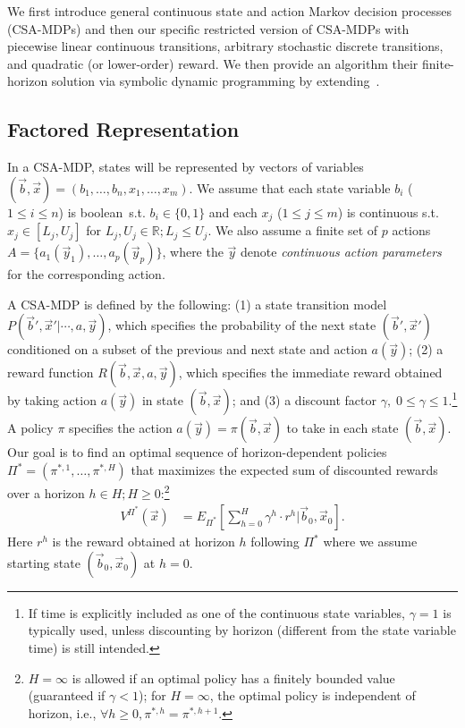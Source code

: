\label{sec:csamdp}

We first introduce general continuous state and action Markov decision
processes (CSA-MDPs) and then our specific restricted version of
CSA-MDPs with piecewise linear continuous transitions,
arbitrary stochastic discrete transitions, and quadratic (or
lower-order) reward.  We then provide an algorithm their
finite-horizon solution via symbolic dynamic programming by
extending~\cite{sanner_uai11}.

\subsection{Factored Representation}

In a CSA-MDP, states will be represented by vectors of variables
$(\vec{b},\vec{x}) = ( b_1,\ldots,b_n,x_{1},\ldots,x_m )$.  We assume
that each state variable $b_i$ ($1 \leq i \leq n$) is
boolean$\,$ s.t. $b_i \in \{ 0,1 \}$ and each $x_j$ ($1 \leq j \leq m$) is 
continuous s.t. $x_j \in [L_j,U_j]$ for $L_j,U_j \in
\mathbb{R}; L_j \leq U_j$.  We also assume a finite set of $p$ actions $A
= \{ a_1(\vec{y}_1), \ldots, a_p(\vec{y}_p) \}$, where the $\vec{y}$ denote
\emph{continuous action parameters} for the corresponding action.

A CSA-MDP is defined by the following: (1) a state transition model
$P(\vec{b}',\vec{x}'|\cdots,a,\vec{y})$, which specifies the
probability of the next state $(\vec{b}',\vec{x}')$ conditioned on a
subset of the previous and next state and action $a(\vec{y})$; (2) a
reward function $R(\vec{b},\vec{x},a,\vec{y})$, which specifies the
immediate reward obtained by taking action $a(\vec{y})$ in state
$(\vec{b},\vec{x})$; and (3) a discount factor $\gamma, \; 0 \leq
\gamma \leq 1$.\footnote{If time is explicitly included as one of the
continuous state variables, $\gamma = 1$ is typically used, unless
discounting by horizon (different from the state variable time) is
still intended.}  A policy $\pi$ specifies the action $a(\vec{y}) =
\pi(\vec{b},\vec{x})$ to take in each state $(\vec{b},\vec{x})$.  Our
goal is to find an optimal sequence of horizon-dependent policies
$\Pi^* = (\pi^{*,1},\ldots,\pi^{*,H})$ that maximizes the expected sum
of discounted rewards over a horizon $h \in H; H \geq
0$:\footnote{$H=\infty$ is allowed if an optimal policy has a finitely
bounded value (guaranteed if $\gamma < 1$); for $H=\infty$, the
optimal policy is independent of horizon, i.e., $\forall h \geq 0,
\pi^{*,h} = \pi^{*,h+1}$.}
\begin{align}
V^{\Pi^*}(\vec{x}) & = E_{\Pi^*} \left[ \sum_{h=0}^{H} \gamma^h \cdot r^h \Big| \vec{b}_0,\vec{x}_0 \right]. \label{eq:vfun_def}
\end{align}
Here $r^h$ is the reward obtained at horizon $h$ following $\Pi^*$ where 
we assume starting state $(\vec{b}_0,\vec{x}_0)$ at $h=0$.
 
